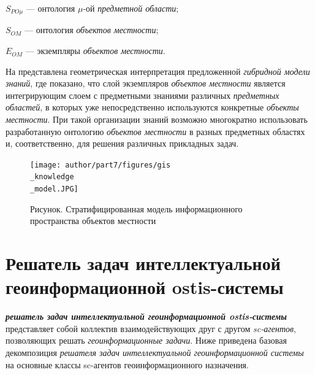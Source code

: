 \hangindent=22mm 
$S_{PO\mu}$ --- онтология ${\mu}$-ой \textit{предметной области};

\hangindent=30mm 
$S_{OM}$ --- онтология \textit{объектов местности};

\hangindent=30mm 
$E_{OM}$ --- экземпляры \textit{объектов местности}.

На  представлена геометрическая интерпретация предложенной \textit{гибридной модели знаний}, где показано, что слой экземпляров \textit{объектов местности} является интегрирующим слоем с предметными знаниями различных \textit{предметных областей}, в которых уже непосредственно используются конкретные \textit{объекты местности}. При такой организации знаний возможно многократно использовать  разработанную онтологию \textit{объектов местности} в разных предметных областях и, соответственно, для решения различных прикладных задач.

\begin{figure}[H]
	\center
	\caption{Рисунок. Стратифицированная модель информационного пространства объектов местности}
	\texttt{[image: author/part7/figures/gis\\\_knowledge\\\_model.JPG]}
	\label{fig:pic2_1}
\end{figure}

\section{Решатель задач интеллектуальной геоинформационной ostis-системы}
\label{chapter_gis_ps}

\textbf{\textit{решатель задач интеллектуальной геоинформационной ostis-системы}} представляет собой коллектив взаимодействующих друг с другом \textit{sc-агентов}, позволяющих решать \textit{геоинформационные задачи}. Ниже приведена базовая декомпозиция \textit{решателя задач интеллектуальной геоинформационной системы} на основные классы sc-агентов геоинформационного назначения.

